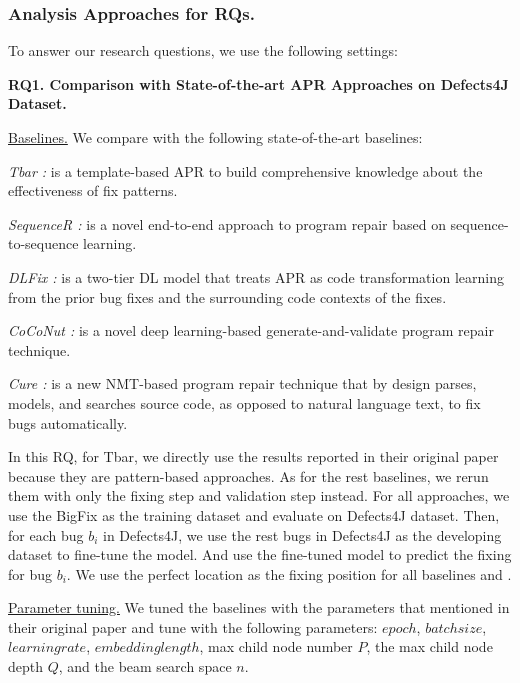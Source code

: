 \subsubsection{Analysis Approaches for RQs.} 
\hspace{1cm}
To answer our research	questions, we use the following settings:

{\bf RQ1. Comparison with State-of-the-art APR Approaches on Defects4J Dataset.}

\underline{Baselines.} We compare {\tool} with the following state-of-the-art baselines:


{\it Tbar \cite{tbar-issta19}: } is a template-based APR to build comprehensive knowledge about the effectiveness of fix patterns.

{\it SequenceR \cite{chen2018sequencer}: } is a novel end-to-end approach to program repair based on sequence-to-sequence learning.

{\it DLFix \cite{li2020dlfix}: } is a two-tier DL model that treats APR as code transformation learning from the prior bug fixes and the surrounding code contexts of the fixes.

{\it CoCoNut \cite{lutellier2020coconut}: } is a novel deep learning-based generate-and-validate program repair technique.

{\it Cure \cite{cure-icse21}: } is a new NMT-based program repair technique that by design parses, models, and searches source code, as opposed to natural language text, to fix bugs automatically.

In this RQ, for %
Tbar, we directly use the results reported in their original paper because they are pattern-based approaches. As for the rest baselines, we rerun them with only the fixing step and validation step instead. For all approaches, we use the BigFix as the training dataset and evaluate on Defects4J dataset. Then, for each bug $b_i$ in Defects4J, we use the rest bugs in Defects4J as the developing dataset to fine-tune the model. And use the fine-tuned model to predict the fixing for bug $b_i$. We use the perfect location as the fixing position for all baselines and \tool. 

\underline{Parameter tuning.} We tuned the baselines with the parameters that mentioned in their original paper and tune \tool with the following parameters: $epoch$, $batch size$, $learning rate$, $embedding length$, max child node number $P$, the max child node depth $Q$, and the beam search space $n$. {\color{blue}{I will add the final parameters when the experiments are all finished}}

